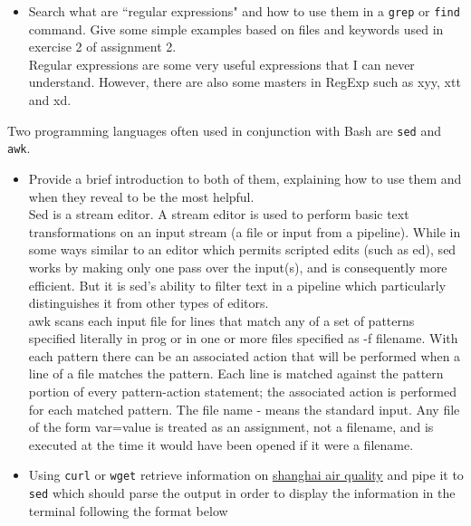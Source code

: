 \documentclass{article}
\begin{document}
\begin{itemize}
\item Search what are ``regular expressions" and how to use them in a \texttt{grep} or \texttt{find} command. Give some simple examples based on files and keywords used in exercise 2 of assignment 2.\\[0.5em]
Regular expressions are some very useful expressions that I can never understand. However, there are also some masters in RegExp such as xyy, xtt and xd.

\end{itemize}

Two programming languages often used in conjunction with Bash are \texttt{sed} and \texttt{awk}.

\begin{itemize}
\item Provide a brief introduction to both of them, explaining how to use them and when they reveal to be the most helpful. \\[0.5em]
Sed  is  a  stream editor.  A stream editor is used to perform basic text transformations on an input stream (a file or input from a pipeline).  While in some ways similar to an
       editor which permits scripted edits (such as ed), sed works by making only one pass over the input(s), and is consequently more efficient.  But it is  sed's  ability  to  filter
       text in a pipeline which particularly distinguishes it from other types of editors. \\[0.5em]
awk scans each input file for lines that match any of a set of patterns
     specified literally in prog or in one or more files specified as -f
     filename.  With each pattern there can be an associated action that will
     be performed when a line of a file matches the pattern.  Each line is
     matched against the pattern portion of every pattern-action statement;
     the associated action is performed for each matched pattern.  The file
     name - means the standard input.  Any file of the form var=value is
     treated as an assignment, not a filename, and is executed at the time it
     would have been opened if it were a filename.

\item Using \texttt{curl} or \texttt{wget} retrieve information on \href{http://aqicn.org/?city=Shanghai&widgetscript&size=large}{shanghai air quality} and pipe it to \texttt{sed} which should parse the output in order to display the information in the terminal following the format below


\end{itemize}
\end{document}
